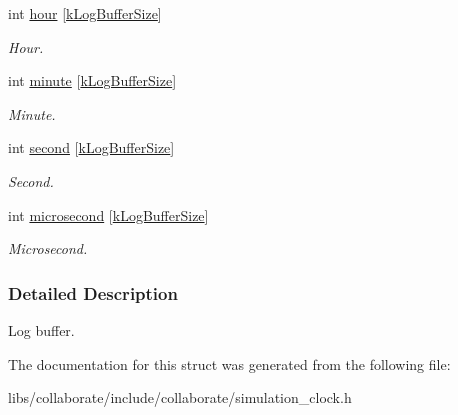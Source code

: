 \begin{DoxyCompactItemize}
\mbox{\label{structosse_1_1collaborate_1_1_simulation_clock_1_1_log_buffer_ac4ee173e0f2102ebb46a89120678096d}} 
int \hyperlink{structosse_1_1collaborate_1_1_simulation_clock_1_1_log_buffer_ac4ee173e0f2102ebb46a89120678096d}{hour} \mbox{[}\hyperlink{classosse_1_1collaborate_1_1_simulation_clock_a026eab97f275ec2d672f40b0b0bb7a3d}{k\+Log\+Buffer\+Size}\mbox{]}
\begin{DoxyCompactList}\small\item\em Hour. \end{DoxyCompactList}\item 
\mbox{\label{structosse_1_1collaborate_1_1_simulation_clock_1_1_log_buffer_a87b9d9ad576d00925c25feae0cf249da}} 
int \hyperlink{structosse_1_1collaborate_1_1_simulation_clock_1_1_log_buffer_a87b9d9ad576d00925c25feae0cf249da}{minute} \mbox{[}\hyperlink{classosse_1_1collaborate_1_1_simulation_clock_a026eab97f275ec2d672f40b0b0bb7a3d}{k\+Log\+Buffer\+Size}\mbox{]}
\begin{DoxyCompactList}\small\item\em Minute. \end{DoxyCompactList}\item 
\mbox{\label{structosse_1_1collaborate_1_1_simulation_clock_1_1_log_buffer_ae570f2683f0566f734ab3eb85122fdd4}} 
int \hyperlink{structosse_1_1collaborate_1_1_simulation_clock_1_1_log_buffer_ae570f2683f0566f734ab3eb85122fdd4}{second} \mbox{[}\hyperlink{classosse_1_1collaborate_1_1_simulation_clock_a026eab97f275ec2d672f40b0b0bb7a3d}{k\+Log\+Buffer\+Size}\mbox{]}
\begin{DoxyCompactList}\small\item\em Second. \end{DoxyCompactList}\item 
\mbox{\label{structosse_1_1collaborate_1_1_simulation_clock_1_1_log_buffer_af9184076cb81bdf080d59df2d3df38a6}} 
int \hyperlink{structosse_1_1collaborate_1_1_simulation_clock_1_1_log_buffer_af9184076cb81bdf080d59df2d3df38a6}{microsecond} \mbox{[}\hyperlink{classosse_1_1collaborate_1_1_simulation_clock_a026eab97f275ec2d672f40b0b0bb7a3d}{k\+Log\+Buffer\+Size}\mbox{]}
\begin{DoxyCompactList}\small\item\em Microsecond. \end{DoxyCompactList}\end{DoxyCompactItemize}


\subsubsection{Detailed Description}
Log buffer. 

The documentation for this struct was generated from the following file\+:\begin{DoxyCompactItemize}
\item 
libs/collaborate/include/collaborate/simulation\+\_\+clock.\+h\end{DoxyCompactItemize}

